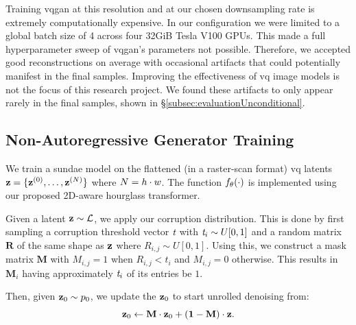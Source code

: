 Training \gls{vqgan} at this resolution and at our chosen downsampling rate is
extremely computationally expensive. In our configuration we were limited to a
global batch size of 4 across four 32GiB Tesla V100 GPUs. This made a full
hyperparameter sweep of \gls{vqgan}'s parameters not possible. Therefore, we
accepted good reconstructions on average with occasional artifacts that could
potentially manifest in the final samples. Improving the effectiveness of \gls{vq}
image models is not the focus of this research project. We
found these artifacts to only appear rarely in the final samples, shown in
\S\ref{subsec:evaluationUnconditional}.

\subsection{Non-Autoregressive Generator Training}
\label{subsec:sundaeTraining}

We train a \gls{sundae} model on the flattened (in a raster-scan format)
\gls{vq} latents $\mathbf{z} = \{\mathbf{z}^{(0)}, \dots, \mathbf{z}^{(N)}\}$
where $N = h \cdot w$. The function $f_\theta(\cdot)$ is
implemented using our proposed 2D-aware hourglass transformer. 

Given a latent $\mathbf{z} \sim \mathcal{L}$, we apply our corruption
distribution. This is done by first sampling a corruption threshold vector
$\textit{t}$ with $\textit{t}_i \sim U[0, 1]$ and a random
matrix $\mathbf{R}$ of the same shape as $\mathbf{z}$ where $R_{i,j} \sim U[0,1]$.
Using this, we construct a mask matrix $\mathbf{M}$ with $M_{i,j} = 1$ when
$R_{i,j} < t_i$ and $M_{i,j} = 0$ otherwise. This results in $\mathbf{M}_i$ having
approximately $\textit{t}_i$ of its entries be $1$.

Then, given $\mathbf{z}_0 \sim p_0$, we update the $\mathbf{z}_0$ to start unrolled
denoising from:
\begin{equation}
    \mathbf{z}_0 \leftarrow \mathbf{M} \cdot \mathbf{z}_0 + (\mathbf{1} - \mathbf{M})
    \cdot \mathbf{z} \text{.}
\end{equation}

